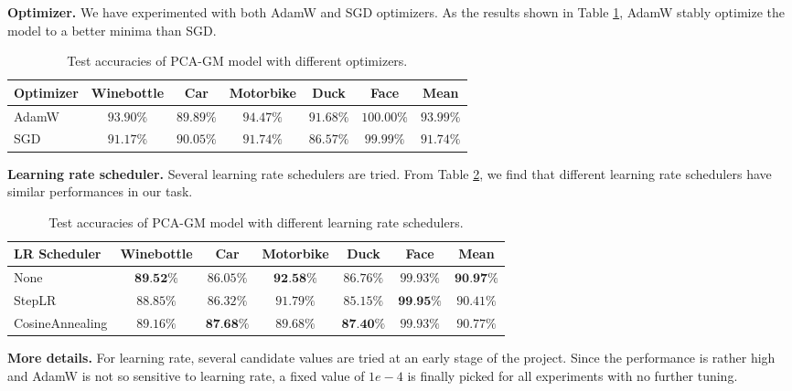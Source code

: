 \documentclass[a4paper]{article}
\begin{document}
\textbf{Optimizer.}
We have experimented with both AdamW and SGD optimizers. As the results shown in Table \ref{tab:optimizer}, AdamW stably optimize the model to a better minima than SGD. 

\begin{table}[htbp]
    \centering
    \begin{tabular}{lcccccc}
        \toprule
        Optimizer& Winebottle& Car& Motorbike& Duck& Face& Mean\\
        \midrule
        AdamW& $93.90\%$& $89.89\%$& $94.47\%$& $91.68\%$& $100.00\%$& $93.99\%$\\
        SGD& $91.17\%$& $90.05\%$& $91.74\%$& $86.57\%$& $99.99\%$& $91.74\%$\\
        \bottomrule
        
    \end{tabular}
    \caption{Test accuracies of PCA-GM model with different optimizers.}
    \label{tab:optimizer}
\end{table}

\textbf{Learning rate scheduler.}
Several learning rate schedulers are tried. From Table \ref{tab:scheduler}, we find that different learning rate schedulers have similar performances in our task.

\begin{table}[htbp]
    \centering
    \begin{tabular}{lcccccc}
        \toprule
        LR Scheduler& Winebottle& Car& Motorbike& Duck& Face& Mean\\
        \midrule
        None& $\textbf{89.52\%}$& $86.05\%$& $\textbf{92.58\%}$& $86.76\%$& $99.93\%$& $\textbf{90.97\%}$\\
        StepLR& $88.85\%$& $86.32\%$& $91.79\%$& $85.15\%$& $\textbf{99.95\%}$& $90.41\%$\\
        CosineAnnealing& $89.16\%$& $\textbf{87.68\%}$& $89.68\%$& $\textbf{87.40\%}$& $99.93\%$& $90.77\%$\\
        \bottomrule
        
    \end{tabular}
    \caption{Test accuracies of PCA-GM model with different learning rate schedulers.}
    \label{tab:scheduler}
\end{table}

\textbf{More details.}
For learning rate, several candidate values are tried at an early stage of the project. Since the performance is rather high and AdamW is not so sensitive to learning rate, a fixed value of $1e-4$ is finally picked for all experiments with no further tuning.
\end{document}
